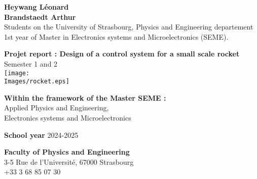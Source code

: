 \begin{titlepage}
	\raggedright
	\textbf{Heywang Léonard}	\\
	\textbf{Brandstaedt Arthur}  \\
	Students on the University of Strasbourg, Physics and Engineering departement\\
	1st year of Master in Electronics systems and Microelectronics (SEME).

	\raggedleft

	\centering
	\vspace{1cm}

	\huge
	\textbf{Projet report : Design of a control system for a small scale rocket}\\
	Semester 1 and 2\\
	\vspace{0.5cm}
	\texttt{[image: \\Images/rocket.eps]}

	\raggedright
	\normalsize
	\vspace{1cm}
	\textbf{Within the framework of the Master SEME :}\\
	Applied Physics and Engineering, \\
	Electronics systems and Microelectronics

	\vspace{1cm}
	\textbf{School year} 2024-2025

	\vspace{1cm}
	\textbf{Faculty of Physics and Engineering}\\
	3-5 Rue de l'Université, 67000 Strasbourg\\
	+33 3 68 85 07 30

	\vspace{1 cm}
	\centering
	\begin{figure}[!ht]%
		\centering
		\qquad
	\end{figure}
\end{titlepage}

